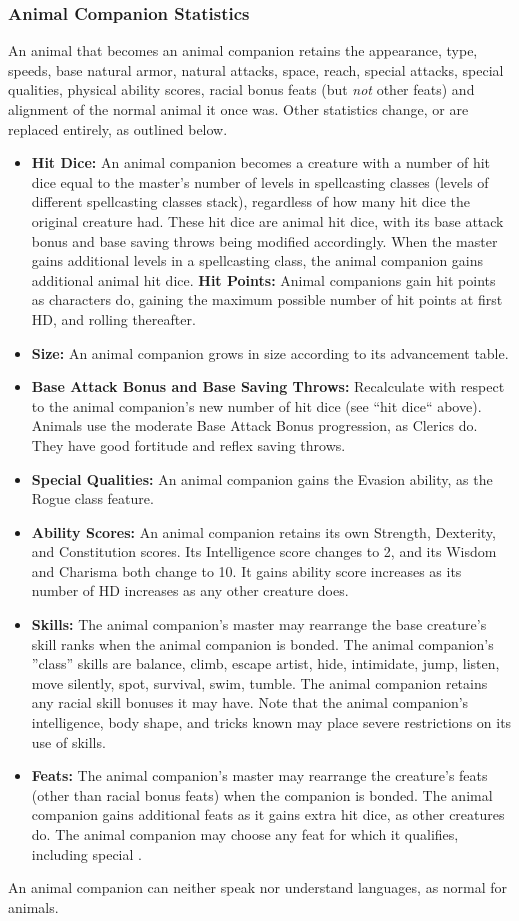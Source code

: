 \subsubsection{Animal Companion Statistics}
An animal that becomes an animal companion retains the appearance, type, speeds, base natural armor, natural attacks, space, reach, special attacks, special qualities, 
physical ability scores, racial bonus feats (but \emph{not} other feats) and alignment of the normal animal it once was. 
Other statistics change, or are replaced entirely, as outlined below.
\begin{itemize}
 \item \textbf{Hit Dice:} An animal companion becomes a creature with a number of hit dice equal to the master's number of levels in spellcasting classes 
 (levels of different spellcasting classes stack), 
 regardless of how many hit dice the original creature had. 
 These hit dice are animal hit dice, with its base attack bonus and base saving throws being modified accordingly.
 When the master gains additional levels in a spellcasting class, the animal companion gains additional animal hit dice. 
 \subitem \textbf{Hit Points:} Animal companions gain hit points as characters do, gaining the maximum possible number of hit points at first HD, 
 and rolling thereafter.
 \item \textbf{Size:} An animal companion grows in size according to its advancement table.
 \item \textbf{Base Attack Bonus and Base Saving Throws:} Recalculate with respect to the animal companion's new number of hit dice (see ``hit dice`` above). 
 Animals use the moderate Base Attack Bonus progression, as Clerics do. They have good fortitude and reflex saving throws.
 \item \textbf{Special Qualities:} An animal companion gains the Evasion ability, as the Rogue class feature.
 \item \textbf{Ability Scores:} An animal companion retains its own Strength, Dexterity, and Constitution scores. 
 Its Intelligence score changes to 2, and its Wisdom and Charisma both change to 10.
 It gains ability score increases as its number of HD increases as any other creature does.
 \item \textbf{Skills:} The animal companion's master may rearrange the base creature's skill ranks when the animal companion is bonded. 
 The animal companion's ''class'' skills are balance, climb, escape artist, hide, intimidate, jump, listen, move silently, spot, survival, swim, tumble. 
 The animal companion retains any racial skill bonuses it may have.
 Note that the animal companion's intelligence, body shape, and tricks known may place severe restrictions on its use of skills.
 \item \textbf{Feats:} The animal companion's master may rearrange the creature's feats (other than racial bonus feats) when the companion is bonded.
 The animal companion gains additional feats as it gains extra hit dice, as other creatures do. 
 The animal companion may choose any feat for which it qualifies, including special .
\end{itemize}
An animal companion can neither speak nor understand languages, as normal for animals.

